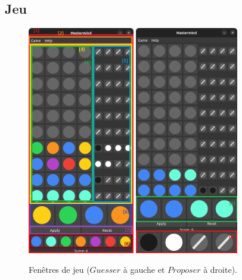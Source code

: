 \subsection{Jeu}

\begin{figure}[htbp]
    \centering
    \includegraphics[width=0.414\textwidth]{game_guesser.png}
    \includegraphics[width=0.4\textwidth]{game_proposer.png}
    \caption{Fenêtres de jeu ($Guesser$ à gauche et $Proposer$ à droite).}
\end{figure}

